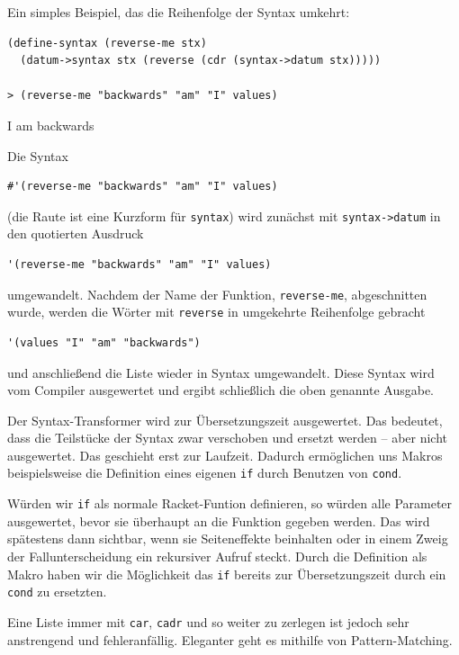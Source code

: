 Ein simples Beispiel, das die Reihenfolge der Syntax umkehrt:

\begin{lstlisting}
(define-syntax (reverse-me stx)
  (datum->syntax stx (reverse (cdr (syntax->datum stx)))))
  
> (reverse-me "backwards" "am" "I" values)
\end{lstlisting}
{\routput {\qq}I{\qq} {\qq}am{\qq} {\qq}backwards{\qq}}

Die Syntax

\begin{lstlisting}
#'(reverse-me "backwards" "am" "I" values)
\end{lstlisting}

(die Raute ist eine Kurzform für \texttt{syntax}) wird zunächst mit \texttt{syntax->datum} in den quotierten Ausdruck 

\begin{lstlisting}
'(reverse-me "backwards" "am" "I" values)
\end{lstlisting}


umgewandelt. Nachdem der Name der Funktion, \texttt{reverse-me}, abgeschnitten wurde, werden die Wörter mit \texttt{reverse} in umgekehrte Reihenfolge gebracht

\begin{lstlisting}
'(values "I" "am" "backwards")
\end{lstlisting}

und anschließend die Liste wieder in Syntax umgewandelt. Diese Syntax wird vom Compiler ausgewertet und ergibt schließlich die oben genannte Ausgabe.


Der Syntax-Transformer wird zur Übersetzungszeit ausgewertet. Das bedeutet, dass die Teilstücke der Syntax zwar verschoben und ersetzt werden -- aber nicht ausgewertet. Das geschieht erst zur Laufzeit. Dadurch ermöglichen uns Makros beispielsweise die Definition eines eigenen \texttt{if} durch Benutzen von \texttt{cond}.

Würden wir \texttt{if} als normale Racket-Funtion definieren, so würden alle Parameter ausgewertet, bevor sie überhaupt an die Funktion gegeben werden. Das wird spätestens dann sichtbar, wenn sie Seiteneffekte beinhalten oder in einem Zweig der Fallunterscheidung ein rekursiver Aufruf steckt. Durch die Definition als Makro haben wir die Möglichkeit das \texttt{if} bereits zur Übersetzungszeit durch ein \texttt{cond} zu ersetzten.


Eine Liste immer mit \texttt{car}, \texttt{cadr} und so weiter zu zerlegen ist jedoch sehr anstrengend und fehleranfällig. Eleganter geht es mithilfe von Pattern-Matching. %


